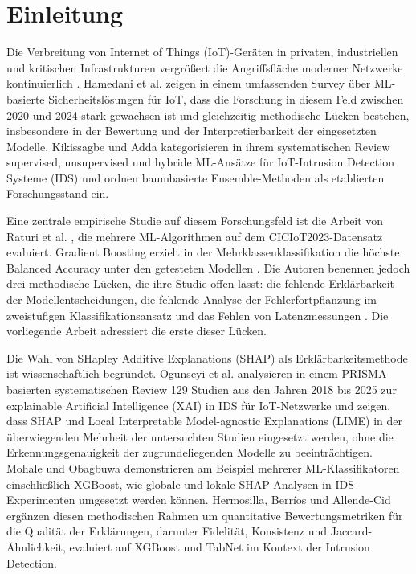 \section{Einleitung}\label{einleitung}

Die Verbreitung von Internet of Things (IoT)-Geräten in privaten, industriellen und kritischen Infrastrukturen vergrößert die Angriffsfläche moderner Netzwerke kontinuierlich \cite{hamedani2025iotsurvey}. Hamedani et al. \cite{hamedani2025iotsurvey} zeigen in einem umfassenden Survey über ML-basierte Sicherheitslösungen für IoT, dass die Forschung in diesem Feld zwischen 2020 und 2024 stark gewachsen ist und gleichzeitig methodische Lücken bestehen, insbesondere in der Bewertung und der Interpretierbarkeit der eingesetzten Modelle. Kikissagbe und Adda \cite{kikissagbe2024review} kategorisieren in ihrem systematischen Review supervised, unsupervised und hybride ML-Ansätze für IoT-Intrusion Detection Systeme (IDS) und ordnen baumbasierte Ensemble-Methoden als etablierten Forschungsstand ein.

Eine zentrale empirische Studie auf diesem Forschungsfeld ist die Arbeit von Raturi et al. \cite{raturi2026exploratory}, die mehrere ML-Algorithmen auf dem CICIoT2023-Datensatz \cite{neto2023ciciot2023} evaluiert. Gradient Boosting erzielt in der Mehrklassenklassifikation die höchste Balanced Accuracy unter den getesteten Modellen \cite{raturi2026exploratory}. Die Autoren benennen jedoch drei methodische Lücken, die ihre Studie offen lässt: die fehlende Erklärbarkeit der Modellentscheidungen, die fehlende Analyse der Fehlerfortpflanzung im zweistufigen Klassifikationsansatz und das Fehlen von Latenzmessungen \cite{raturi2026exploratory}. Die vorliegende Arbeit adressiert die erste dieser Lücken.

Die Wahl von SHapley Additive Explanations (SHAP) als Erklärbarkeitsmethode ist wissenschaftlich begründet. Ogunseyi et al. \cite{ogunseyi2026xai_review} analysieren in einem PRISMA-basierten systematischen Review 129 Studien aus den Jahren 2018 bis 2025 zur explainable Artificial Intelligence (XAI) in IDS für IoT-Netzwerke und zeigen, dass SHAP und Local Interpretable Model-agnostic Explanations (LIME) in der überwiegenden Mehrheit der untersuchten Studien eingesetzt werden, ohne die Erkennungsgenauigkeit der zugrundeliegenden Modelle zu beeinträchtigen. Mohale und Obagbuwa \cite{mohale2025xai} demonstrieren am Beispiel mehrerer ML-Klassifikatoren einschließlich XGBoost, wie globale und lokale SHAP-Analysen in IDS-Experimenten umgesetzt werden können. Hermosilla, Berríos und Allende-Cid \cite{hermosilla2025xai_forensic} ergänzen diesen methodischen Rahmen um quantitative Bewertungsmetriken für die Qualität der Erklärungen, darunter Fidelität, Konsistenz und Jaccard-Ähnlichkeit, evaluiert auf XGBoost und TabNet im Kontext der Intrusion Detection.

